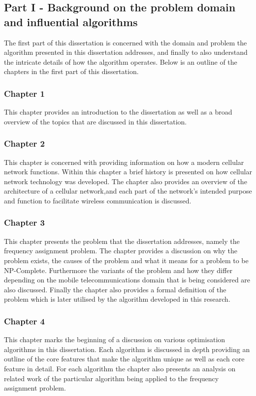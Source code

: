 \subsection{Part I - Background on the problem domain and influential algorithms}
The first part of this dissertation is concerned with the domain and problem the algorithm presented in this dissertation addresses, and finally to also understand the intricate details of how the algorithm operates.
Below is an outline of the chapters in the first part of this dissertation.
\subsubsection{Chapter 1}
This chapter provides an introduction to the dissertation as well as a broad overview of the topics that are discussed in this dissertation.
\subsubsection{Chapter 2}
This chapter is concerned with providing information on how a modern cellular network functions. Within this chapter a brief history is presented on how cellular network technology was developed. The chapter also provides an overview of the architecture of a cellular network,and each part of the network's intended purpose and function to facilitate wireless communication is discussed.
\subsubsection{Chapter 3}
This chapter presents the problem that the dissertation addresses, namely the frequency assignment problem. The chapter provides a discussion on why the problem exists, the causes of the problem and what it means for a problem to be NP-Complete. Furthermore the variants of the problem and how they differ depending on the mobile telecommunications domain that is being considered are also discussed. Finally the chapter also provides a formal definition of the problem which is later utilised by the algorithm developed in this research.
\subsubsection{Chapter 4}
This chapter marks the beginning of a discussion on various optimisation algorithms in this dissertation. Each algorithm is discussed in depth providing an outline of the core features that make the algorithm unique as well as each core feature in detail. For each algorithm the chapter also presents an analysis on related work of the particular algorithm being applied to the frequency assignment problem. 
